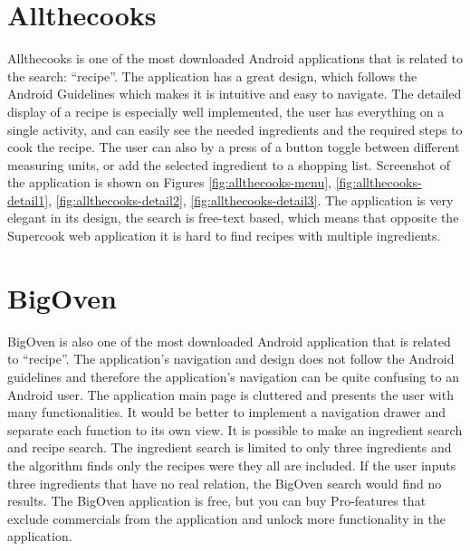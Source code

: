 \section{Allthecooks}
Allthecooks is one of the most downloaded \cite{allthecooks-googleplay} Android applications that is related to the search: ``recipe''. The application has a great design, which follows the Android Guidelines which makes it is intuitive and easy to navigate. The detailed display of a recipe is especially well implemented, the user has everything on a single activity, and can easily see the needed ingredients and the required steps to cook the recipe. The user can also by a press of a button toggle between different measuring units, or add the selected ingredient to a shopping list. Screenshot of the application is shown on Figures \ref{fig:allthecooks-menu}, \ref{fig:allthecooks-detail1}, \ref{fig:allthecooks-detail2}, \ref{fig:allthecooks-detail3}. The application is very elegant in its design, the search is free-text based, which means that opposite the Supercook web application it is hard to find recipes with multiple ingredients.

\section{BigOven}
BigOven is also one of the most downloaded \cite{bigoven-googleplay} Android application that is related to ``recipe''. The application's navigation and design does not follow the Android guidelines\cite{guidelines-appstructure} and therefore the application's navigation can be quite confusing to an Android user.  The application main page is cluttered and presents the user with many functionalities. It would be better to implement a navigation drawer and separate each function to its own view. 
It is possible to make an ingredient search and recipe search. The ingredient search is limited to only three ingredients and the algorithm finds only the recipes were they all are included. If the user inputs three ingredients that have no real relation, the BigOven search would find no results. The BigOven application is free, but you can buy Pro-features that exclude commercials from the application and unlock more functionality in the application. 

